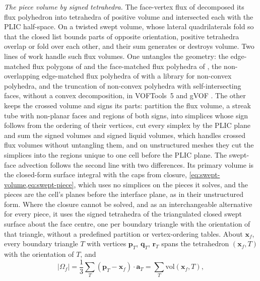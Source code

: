 \documentclass[preprint,12pt]{elsarticle}
\newcommand{\x}{\mathbf{x}}
\begin{document}
\emph{The piece volume by signed tetrahedra.} The face-vertex flux of \citet{MaricMarschallBothe2018} decomposed its flux polyhedron into tetrahedra of positive volume and intersected each with the PLIC half-space. On a twisted swept volume, whose lateral quadrilaterals fold so that the closed list bounds parts of opposite orientation, positive tetrahedra overlap or fold over each other, and their sum generates or destroys volume. Two lines of work handle such flux volumes. One untangles the geometry: the edge-matched flux polygons of \citet{LopezEtAl2004EMFPA} and the face-matched flux polyhedra of \citet{HernandezEtAl2008FMFPA}, the non-overlapping edge-matched flux polyhedra of \citet{IveyMoin2017Unstructured} with a library for non-convex polyhedra, and the truncation of non-convex polyhedra with self-intersecting faces, without a convex decomposition, in VOFTools~5 \citep{LopezEtAl2020VOFTools5} and gVOF \citep{LopezHernandez2022gVOF}. The other keeps the crossed volume and signs its parts: \citet{OwkesDesjardins2014Unsplit} partition the flux volume, a streak tube with non-planar faces and regions of both signs, into simplices whose sign follows from the ordering of their vertices, cut every simplex by the PLIC plane and sum the signed volumes and signed liquid volumes, which handles crossed flux volumes without untangling them, and on unstructured meshes they cut the simplices into the regions unique to one cell before the PLIC plane. The swept-face advection follows the second line with two differences. Its primary volume is the closed-form surface integral with the caps from closure, \cref{eq:swept-volume,eq:swept-piece}, which uses no simplices on the pieces it solves, and the pieces are the cell's planes before the interface plane, as in their unstructured form. Where the closure cannot be solved, and as an interchangeable alternative for every piece, it uses the signed tetrahedra of the triangulated closed swept surface about the face centre, one per boundary triangle with the orientation of that triangle, without a predefined partition or vertex-ordering tables. About $\x_f$, every boundary triangle $T$ with vertices $\mathbf{p}_T$, $\mathbf{q}_T$, $\mathbf{r}_T$ spans the tetrahedron $(\x_f, T)$ with the orientation of $T$, and
\begin{equation}
|\Omega_f| = \frac13\sum_T (\mathbf{p}_T - \x_f)\cdot\mathbf{a}_T = \sum_T \mathrm{vol}(\x_f, T),
\label{eq:swept-signed}
\end{equation}
\end{document}
